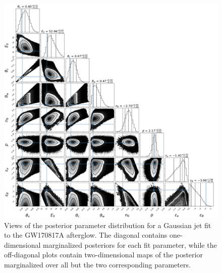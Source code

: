 \documentclass[twocolumn]{aastex62}
\newcommand{\gwbns}{GW170817A}
\begin{document}
\begin{figure}
	\includegraphics[width=\textwidth]{figs/cornerGaussian.png}
	\caption{Views of the posterior parameter distribution for a Gaussian jet fit to the \gwbns{} afterglow.  The diagonal contains one-dimensional marginalized posteriors for each fit parameter, while the off-diagonal plots contain two-dimensional maps of the posterior marginalized over all but the two corresponding parameters. \label{fig:cornerGaussian}}
\end{figure}
\end{document}
